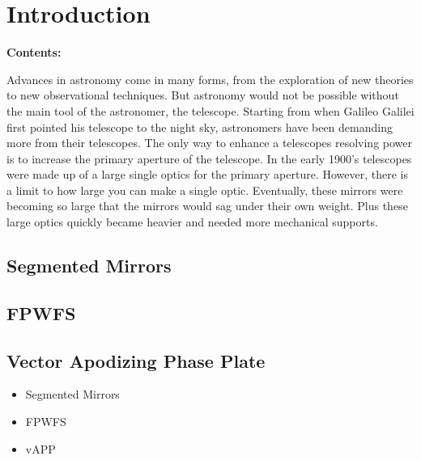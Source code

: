 
\chapter{Introduction} %

\noindent\textbf{\large Contents:}

\noindent\hrulefill
\noindent\startcontents[chapters]
\noindent{}
\noindent\hrulefill

\label{Chapter1} %

Advances in astronomy come in many forms, from the exploration of new theories to new observational techniques.  But astronomy would not be possible without the main tool of the astronomer, the telescope.  Starting from when Galileo Galilei first pointed his telescope to the night sky, astronomers have been demanding more from their telescopes.  The only way to enhance a telescopes resolving power is to increase the primary aperture of the telescope.  In the early 1900's telescopes were made up of a large single optics for the primary aperture.  However, there is a limit to how large you can make a single optic.  Eventually, these mirrors were becoming so large that the mirrors would sag under their own weight.  Plus these large optics quickly became heavier and needed more mechanical supports.




\section{Segmented Mirrors}




\section{FPWFS}



\section{Vector Apodizing Phase Plate}






\begin{itemize}
    \item Segmented Mirrors
    \item FPWFS
    \item vAPP
\end{itemize}



